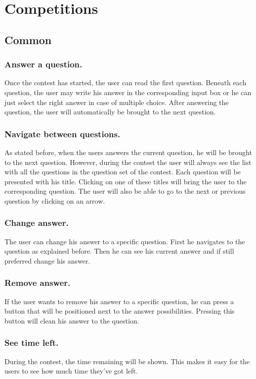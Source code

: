 \section*{Competitions}

\subsection*{Common}

\subsubsection*{Answer a question.} 
Once the contest has started, the user can read the first question. Beneath each question, the user may write his answer in the corresponding input box or he can just select the right answer in case of multiple choice. After answering the question, the user will automatically be brought to the next question. 

\subsubsection*{Navigate between questions.} 
As stated before, when the users answers the current question, he will be brought to the next question. However, during the contest the user will always see the list with all the questions in the question set of the contest. Each question will be presented with his title. Clicking on one of these titles will bring the user to the corresponding question. The user will also be able to go to the next or previous question by clicking on an arrow. 

\subsubsection*{Change answer.} 
The user can change his answer to a specific question. First he navigates to the question as explained before. Then he can see his current answer and if still preferred change his answer. 

\subsubsection*{Remove answer.} 
If the user wants to remove his answer to a specific question, he can press a button that will be positioned next to the answer possibilities. Pressing this button will clean his answer to the question. 

\subsubsection*{See time left.} 
During the contest, the time remaining will be shown. This makes it easy for the users to see how much time they've got left. 

